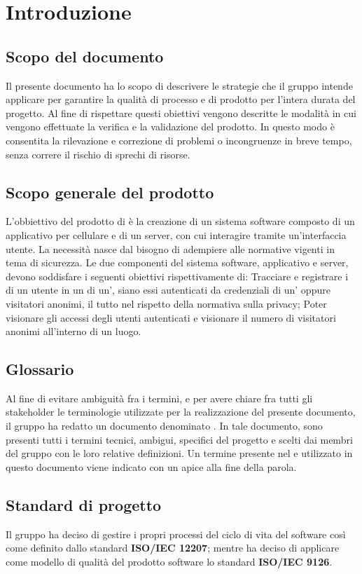 \section{Introduzione}
\subsection{Scopo del documento}
Il presente documento ha lo scopo di descrivere le strategie che il gruppo \Gruppo{} intende applicare per garantire la qualità di processo e di prodotto per l’intera durata del progetto.
Al fine di rispettare questi obiettivi vengono descritte le modalità in cui vengono effettuate la verifica e la validazione del prodotto.
In questo modo è consentita la rilevazione e correzione di problemi o incongruenze in breve tempo, senza correre il rischio di sprechi di risorse.

\subsection{Scopo generale del prodotto}
L'obbiettivo del prodotto \NomeProgetto{} di \Proponente{} è la creazione di un sistema software composto di un applicativo per cellulare e di un server, con cui interagire tramite un'interfaccia utente. La necessità nasce dal bisogno di adempiere alle normative vigenti in tema di sicurezza.
Le due componenti del sistema software, applicativo e server, devono soddisfare i seguenti obiettivi rispettivamente di:
Tracciare e registrare i  di un utente in un  di un', siano essi autenticati da credenziali di un' oppure visitatori anonimi, il tutto nel rispetto della normativa sulla privacy;
Poter visionare gli accessi degli utenti autenticati e visionare il numero di visitatori anonimi all'interno di un luogo.

\subsection{Glossario}
Al fine di evitare ambiguità fra i termini, e per avere chiare fra tutti gli stakeholder le terminologie utilizzate per la realizzazione del presente documento, il gruppo \Gruppo{} ha redatto un documento denominato .
In tale documento, sono presenti tutti i termini tecnici, ambigui, specifici del progetto e scelti dai membri del gruppo con le loro relative definizioni.
Un termine presente nel  e utilizzato in questo documento viene indicato con un apice  alla fine della parola.

\subsection{Standard di progetto}
Il gruppo \Gruppo{} ha deciso di gestire i propri processi del ciclo di vita del software così come definito dallo standard \textbf{ISO/IEC 12207}; 
mentre ha deciso di applicare come modello di qualità del prodotto software lo standard \textbf{ISO/IEC 9126}.